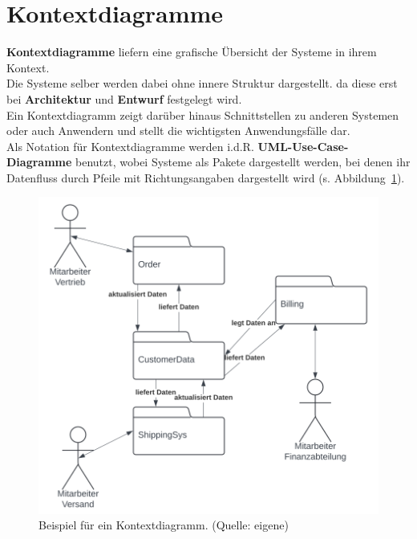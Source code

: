 \section{Kontextdiagramme}

\textbf{Kontextdiagramme} liefern eine grafische Übersicht der Systeme in ihrem Kontext.\\
Die Systeme selber werden dabei ohne innere Struktur dargestellt. da diese erst bei \textbf{Architektur} und \textbf{Entwurf} festgelegt wird.\\
Ein Kontextdiagramm zeigt darüber hinaus Schnittstellen zu anderen Systemen oder auch Anwendern und stellt die wichtigsten Anwendungsfälle dar.\\

\noindent
Als Notation für Kontextdiagramme werden i.d.R. \textbf{UML-Use-Case-Diagramme} benutzt, wobei Systeme als Pakete dargestellt werden, bei denen ihr Datenfluss durch Pfeile mit Richtungsangaben dargestellt wird (s. Abbildung~\ref{fig:usecaseexample}).

\begin{figure}
    \centering
    \includegraphics[scale=0.4]{chapters/Requirements Engineering/img/usecaseexample}
    \caption{Beispiel für ein Kontextdiagramm. (Quelle: eigene)}
    \label{fig:usecaseexample}
\end{figure}
